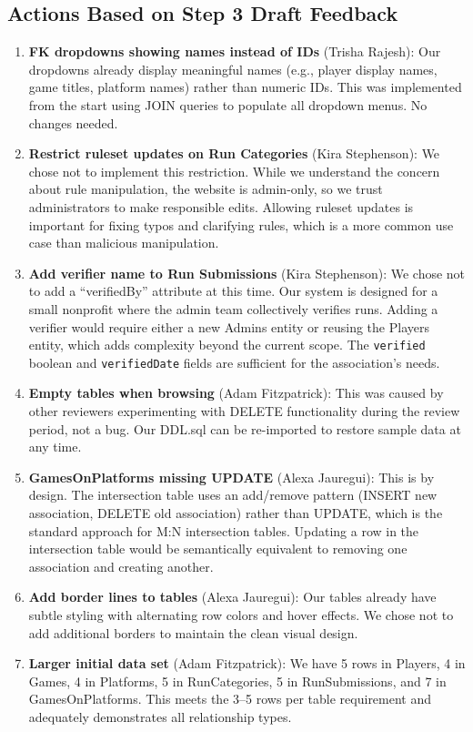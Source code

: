 \documentclass[11pt]{article}
\begin{document}
\subsection*{Actions Based on Step 3 Draft Feedback}

\begin{enumerate}[leftmargin=2em]
    \item \textbf{FK dropdowns showing names instead of IDs} (Trisha Rajesh): Our dropdowns already display meaningful names (e.g., player display names, game titles, platform names) rather than numeric IDs. This was implemented from the start using JOIN queries to populate all dropdown menus. No changes needed.

    \item \textbf{Restrict ruleset updates on Run Categories} (Kira Stephenson): We chose not to implement this restriction. While we understand the concern about rule manipulation, the website is admin-only, so we trust administrators to make responsible edits. Allowing ruleset updates is important for fixing typos and clarifying rules, which is a more common use case than malicious manipulation.

    \item \textbf{Add verifier name to Run Submissions} (Kira Stephenson): We chose not to add a ``verifiedBy'' attribute at this time. Our system is designed for a small nonprofit where the admin team collectively verifies runs. Adding a verifier would require either a new Admins entity or reusing the Players entity, which adds complexity beyond the current scope. The \texttt{verified} boolean and \texttt{verifiedDate} fields are sufficient for the association's needs.

    \item \textbf{Empty tables when browsing} (Adam Fitzpatrick): This was caused by other reviewers experimenting with DELETE functionality during the review period, not a bug. Our DDL.sql can be re-imported to restore sample data at any time.

    \item \textbf{GamesOnPlatforms missing UPDATE} (Alexa Jauregui): This is by design. The intersection table uses an add/remove pattern (INSERT new association, DELETE old association) rather than UPDATE, which is the standard approach for M:N intersection tables. Updating a row in the intersection table would be semantically equivalent to removing one association and creating another.

    \item \textbf{Add border lines to tables} (Alexa Jauregui): Our tables already have subtle styling with alternating row colors and hover effects. We chose not to add additional borders to maintain the clean visual design.

    \item \textbf{Larger initial data set} (Adam Fitzpatrick): We have 5 rows in Players, 4 in Games, 4 in Platforms, 5 in RunCategories, 5 in RunSubmissions, and 7 in GamesOnPlatforms. This meets the 3--5 rows per table requirement and adequately demonstrates all relationship types.
\end{enumerate}
\end{document}
